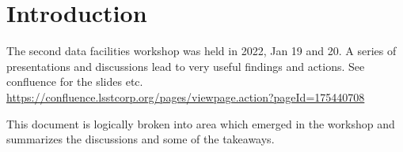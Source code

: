 \section{Introduction}

The second data facilities workshop was held in 2022, Jan 19 and 20.
A series of presentations and discussions lead to very useful findings and actions.
See confluence for the slides etc. \url{https://confluence.lsstcorp.org/pages/viewpage.action?pageId=175440708}


This document is logically broken into area which emerged in the workshop and summarizes the discussions and some of the takeaways.
